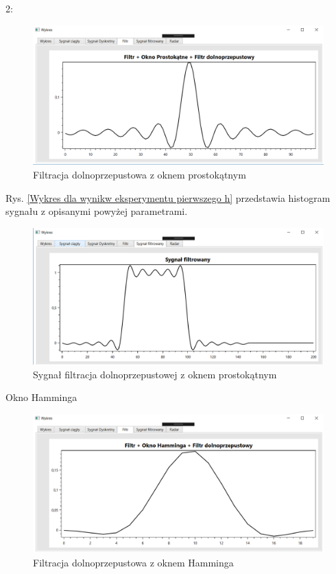\documentclass[12pt]{article}
\begin{document}
2:
\begin{figure}[h!]
 \centering
 \includegraphics[width=12.3cm]{filtrMk.PNG}
 \vspace{-0.3cm}
 \caption{Filtracja dolnoprzepustowa z oknem prostokątnym}
 \label{Wykres dla wyników eksperymentu drugiego}
\end{figure}
\newpage
Rys. \ref{Wykres dla wynikw eksperymentu pierwszego h} przedstawia histogram sygnału z opisanymi powyżej parametrami. 
\begin{figure}[h!]
 \centering
 \includegraphics[width=12.3cm]{filtrMkS.PNG}
 \vspace{-0.3cm}
 \caption{Sygnał filtracja dolnoprzepustowej z oknem prostokątnym}
 \label{Histogram dla wyników eksperymentu drugiego}
\end{figure}
\newpage
Okno Hamminga
\begin{figure}[h!]
 \centering
 \includegraphics[width=12.3cm]{prostFDOHm.PNG}
 \vspace{-0.3cm}
 \caption{Filtracja dolnoprzepustowa z oknem Hamminga}
 \label{Wykres dla wyników eksperymentu drugiego}
\end{figure}
\end{document}
